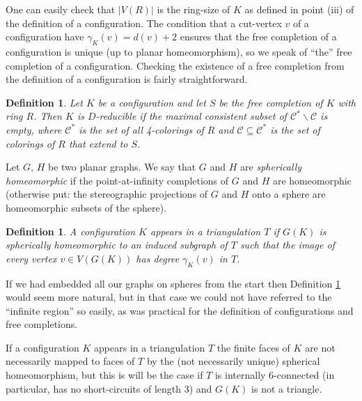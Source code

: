 \documentclass[11pt]{article}
\newtheorem{definition}[theorem]{Definition}
\newcommand{\mcal}{\mathcal}
\newcommand{\back}{\backslash}
\newcommand{\gm}{\gamma}
\begin{document}
One can easily check that $|V(R)|$ is the ring-size of $K$ as defined in point (iii) of the definition of a configuration. The condition that a cut-vertex $v$ of a configuration have $\gm_K(v) = d(v) + 2$ ensures that the free completion of a configuration is unique (up to planar homeomorphism), so we speak of ``the'' free completion of a configuration. Checking the existence of a free completion from the definition of a configuration is fairly straightforward.

\begin{definition}
Let $K$ be a configuration and let $S$ be the free completion of $K$ with ring $R$. Then $K$ is \emph{$D$-reducible} if the maximal consistent subset of $\mcal{C}^*\back \mcal{C}$ is empty, where $\mcal{C}^*$ is the set of all 4-colorings of $R$ and $\mcal{C} \subseteq \mcal{C}^*$ is the set of colorings of $R$ that extend to $S$.
\end{definition}

Let $G$, $H$ be two planar graphs. We say that $G$ and $H$ are \emph{spherically homeomorphic} if the point-at-infinity completions of $G$ and $H$ are homeomorphic (otherwise put: the stereographic projections of $G$ and $H$ onto a sphere are homeomorphic subsets of the sphere). 

\begin{definition}\label{appearsdef}
A configuration $K$ \emph{appears} in a triangulation $T$ if $G(K)$ is spherically homeomorphic to an induced subgraph of $T$ such that the image of every vertex $v \in V(G(K))$ has degree $\gm_K(v)$ in $T$.
\end{definition}

\noindent If we had embedded all our graphs on spheres from the start then Definition \ref{appearsdef} would seem more natural, but in that case we 
could not have referred to the ``infinite region'' so easily, as was practical for the definition of configurations and free completions. 

If a configuration $K$ appears in a triangulation $T$ the finite faces of $K$ are not necessarily mapped to faces of $T$ by the (not necessarily unique) spherical homeomorphism, but this is will be the case if $T$ is internally 6-connected (in particular, has no short-circuits of length 3) and $G(K)$ is not a triangle. 
\end{document}
